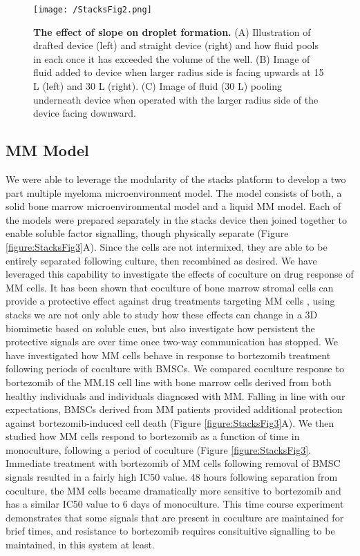 \begin{figure}[h!] %
\centering
\texttt{[image: /StacksFig2.png]}
\caption[\textbf{The effect of slope on droplet formation}]{\textbf{The effect of slope on droplet formation.} (A) Illustration of drafted device (left) and straight device (right) and how fluid pools in each once it has exceeded the volume of the well. (B) Image of fluid added to device when larger radius side is facing upwards at 15 \textmu L (left) and 30 \textmu L (right). (C) Image of fluid (30 \textmu L) pooling underneath device when operated with the larger radius side of the device facing downward.}
\label{figure:StacksFig2}
\end{figure}

\subsection{MM Model}
We were able to leverage the modularity of the stacks platform to develop a two part multiple myeloma microenvironment model. The model consists of both, a solid bone marrow microenvironmental model and a liquid MM model. Each of the models were prepared separately in the stacks device then joined together to enable soluble factor signalling, though physically separate (Figure \ref{figure:StacksFig3}A). Since the cells are not intermixed, they are able to be entirely separated following culture, then recombined as desired. We have leveraged this capability to investigate the effects of coculture on drug response of MM cells. It has been shown that coculture of bone marrow stromal cells can provide a protective effect against drug treatments targeting MM cells \cite{Abdi2013}, using stacks we are not only able to study how these effects can change in a 3D biomimetic based on soluble cues, but also investigate how persistent the protective signals are over time once two-way communication has stopped. We have investigated how MM cells behave in response to bortezomib treatment following periods of coculture with BMSCs. We compared coculture response to bortezomib of the MM.1S cell line with bone marrow cells derived from both healthy individuals and individuals diagnosed with MM. Falling in line with our expectations, BMSCs derived from MM patients provided additional protection against bortezomib-induced cell death (Figure \ref{figure:StacksFig3}A). We then studied how MM cells respond to bortezomib as a function of time in monoculture, following a period of coculture (Figure \ref{figure:StacksFig3}. Immediate treatment with bortezomib of MM cells following removal of BMSC signals resulted in a fairly high IC50 value. 48 hours following separation from coculture, the MM cells became dramatically more sensitive to bortezomib and has a similar IC50 value to 6 days of monoculture. This time course experiment demonstrates that some signals that are present in coculture are maintained for brief times, and resistance to bortezomib requires consituitive signalling to be maintained, in this system at least. 

